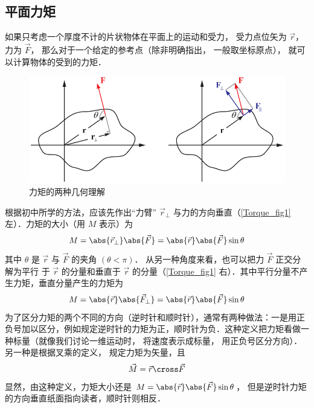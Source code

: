 

\subsection{平面力矩}

如果只考虑一个厚度不计的片状物体在平面上的运动和受力， 受力点位矢为 $\vec r$， 力为 $\vec F$， 那么对于一个给定的参考点（除非明确指出， 一般取坐标原点）， 就可以计算物体的受到的力矩．

\begin{figure}[ht]
\centering
\includegraphics[width=13cm]{./figures/Torque1.pdf}
\caption{力矩的两种几何理解}\label{Torque_fig1}
\end{figure}

根据初中所学的方法，应该先作出“力臂” $\vec r_ \bot$ 与力的方向垂直（\autoref{Torque_fig1} 左）．力矩的大小（用 $M$ 表示）为
\begin{equation}
M = \abs{\vec r_ \bot } \abs{\vec F} = \abs{\vec r} \abs{\vec F} \sin \theta 
\end{equation}
其中 $\theta $ 是 $\vec r$ 与 $\vec F$ 的夹角 $(\theta < \pi)$． 从另一种角度来看，也可以把力 $\vec F$ 正交分解为平行
于 $\vec r$ 的分量和垂直于 $\vec r$ 的分量（\autoref{Torque_fig1} 右）．其中平行分量不产
生力矩，垂直分量产生的力矩为
\begin{equation}
M = \abs{\vec r} \abs{\vec F_ \bot } = \abs{\vec r} \abs{\vec F} \sin \theta 
\end{equation}
为了区分力矩的两个不同的方向（逆时针和顺时针），通常有两种做法：一是用正负号加以区分，例如规定逆时针的力矩为正，顺时针为负．这种定义把力矩看做一种标量（就像我们讨论一维运动时， 将速度表示成标量， 用正负号区分方向）．另一种是根据叉乘的定义， 规定力矩为矢量，且
\begin{equation}\label{Torque_eq3}
\vec M = \vec r \cross \vec F
\end{equation}
显然，由这种定义，力矩大小还是 $M = \abs{\vec r} \abs{\vec F}\sin \theta$， 但是逆时针力矩的方向垂直纸面指向读者，顺时针则相反．

